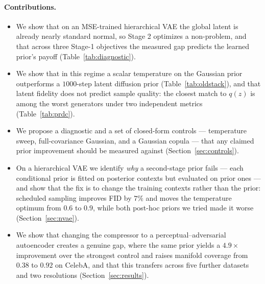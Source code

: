 \documentclass[sigconf,nonacm]{acmart}
\begin{document}
\paragraph{Contributions.}
\begin{itemize}
\item We show that on an MSE-trained hierarchical VAE the global latent is
already nearly standard normal, so Stage 2 optimizes a non-problem, and that
across three Stage-1 objectives the measured gap predicts the learned prior's
payoff (Table~\ref{tab:diagnostic}).
\item We show that in this regime a scalar temperature on the Gaussian prior
outperforms a $1000$-step latent diffusion prior (Table~\ref{tab:oldstack}),
and that latent fidelity does not predict sample quality: the closest match to
$q(z)$ is among the worst generators under two independent metrics
(Table~\ref{tab:prdc}).
\item We propose a diagnostic and a set of closed-form controls --- temperature
sweep, full-covariance Gaussian, and a Gaussian copula --- that any claimed
prior improvement should be measured against (Section~\ref{sec:controls}).
\item On a hierarchical VAE we identify \emph{why} a second-stage prior
fails --- each conditional prior is fitted on posterior contexts but evaluated
on prior ones --- and show that the fix is to change the training contexts
rather than the prior: scheduled sampling improves FID by $7\%$ and moves the
temperature optimum from $0.6$ to $0.9$, while both post-hoc priors we tried
made it worse (Section~\ref{sec:nvae}).
\item We show that changing the compressor to a perceptual--adversarial
autoencoder creates a genuine gap, where the same prior yields a $4.9\times$
improvement over the strongest control and raises manifold coverage from $0.38$
to $0.92$ on CelebA, and that this transfers across five further datasets and
two resolutions
(Section~\ref{sec:results}).
\end{itemize}
\end{document}

